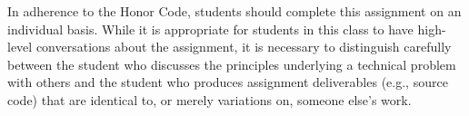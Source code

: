 \documentclass[11pt]{article}
\begin{document}
In adherence to the Honor Code, students should complete this assignment on an
individual basis. While it is appropriate for students in this class to have
high-level conversations about the assignment, it is necessary to distinguish
carefully between the student who discusses the principles underlying a
technical problem with others and the student who produces assignment
deliverables (e.g., source code) that are identical to, or merely variations on,
someone else's work.
\end{document}
